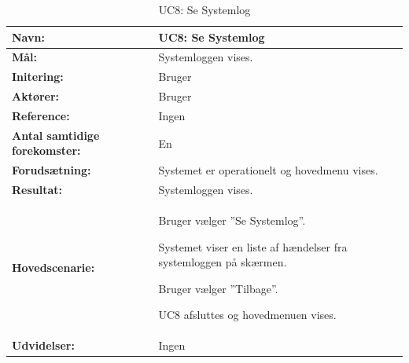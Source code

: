\begin{table}[h]
\begin{tabularx}{\textwidth}{| >{\raggedright\arraybackslash}p{3.3 cm} | >{\raggedright\arraybackslash}X |} \hline

\textbf{Navn:} 						& UC8: Se Systemlog\\ \hline
\textbf{Mål:}						& Systemloggen vises. \\ \hline
\textbf{Initering:}					& Bruger \\ \hline
\textbf{Aktører:} 					& Bruger \\ \hline
\textbf{Reference:} 				& Ingen \\ \hline
\textbf{Antal samtidige forekomster:} & En \\ \hline
\textbf{Forudsætning:} 				& Systemet er operationelt og hovedmenu vises. \\ \hline
\textbf{Resultat:}					& Systemloggen vises. \\ \hline
\textbf{Hovedscenarie:}				& 

\begin{packed_enum}
\item Bruger vælger ”Se Systemlog”.
\item Systemet viser en liste af hændelser fra systemloggen på skærmen.
\item Bruger vælger ”Tilbage”.
\item UC8 afsluttes og hovedmenuen vises. 
\end{packed_enum} \\ \hline
\textbf{Udvidelser:}				&  
Ingen
\\ \hline
\end{tabularx}
\caption{UC8: Se Systemlog}
\label{tbl:UC8}
\end{table}

